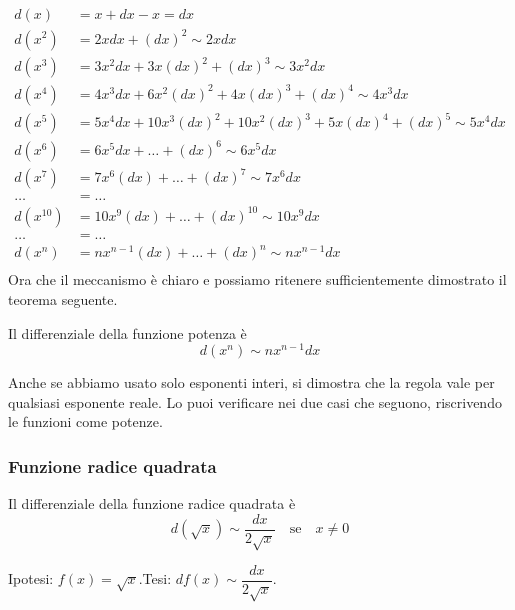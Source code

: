 \begin{align*}
  d(x) &=x+dx-x =dx\\
  d(x^2) &=2xdx +(dx)^2 \sim 2xdx\\
  d(x^3) &=3x^2dx+3x(dx)^2+(dx)^3 \sim 3x^2dx\\
  d(x^4) &=4x^3dx+6x^2(dx)^2+4x(dx)^3+(dx)^4 \sim 4x^3dx\\
  d(x^5) &=5x^4dx+10x^3(dx)^2+10x^2(dx)^3+5x(dx)^4+(dx)^5 \sim 5x^4dx\\
  d(x^6) &=6x^5dx+\dots+(dx)^6 \sim 6x^5dx\\
  d(x^7) &=7x^6(dx)+\dots+(dx)^7 \sim 7x^6dx\\
  \dots &= \dots\\
  d(x^{10}) &=10x^9(dx)+\dots+(dx)^{10} \sim 10x^9dx\\
  \dots &= \dots\\
  d(x^n) &=nx^{n-1}(dx)+\dots+(dx)^{n} \sim nx^{n-1}dx\\    
\end{align*}
Ora che il meccanismo è chiaro e possiamo ritenere sufficientemente 
dimostrato il teorema seguente.

\begin{teorema}
 Il differenziale della funzione potenza è 
 \[d(x^n) \sim nx^{n-1}dx\]
\end{teorema}

\begin{osservazione}
Anche se abbiamo usato solo esponenti interi, si dimostra che 
la regola vale per qualsiasi esponente reale. Lo puoi verificare nei due 
casi che seguono, riscrivendo le funzioni come potenze.
\end{osservazione}

\subsubsection{Funzione radice quadrata}
\label{subsubsec:diff01_diffradq}

\begin{teorema}
 Il differenziale della funzione radice quadrata è
 \[d(\sqrt{x})\sim\frac{dx}{2\sqrt{x}} \quad \text{se} \quad x \neq 0\]
\end{teorema}

\noindent Ipotesi: \(f(x)=\sqrt{x}\).\tab Tesi: 
\(df(x)\sim\dfrac{dx}{2\sqrt{x}}\).

